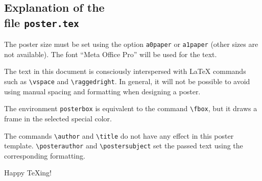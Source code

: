 \documentclass[a1paper, english]{article}
\begin{document}

\begin{posterbox}
	\vspace{-10mm}
	\raggedright

	\section*{Explanation of the\\file \texttt{poster.tex}}
	The poster size must be set using the option \verb+a0paper+ or \verb+a1paper+ (other sizes are not available).
	The font “Meta Office Pro” will be used for the text.

	The text in this document is consciously interspersed with \LaTeX{} commands such as \verb+\vspace+ and \verb+\raggedright+.
	In general, it will not be possible to avoid using manual spacing and formatting when designing a poster.

	The environment \verb+posterbox+ is equivalent to the command \verb+\fbox+, but it draws a frame in the selected special color.

	The commands \verb+\author+ and \verb+\title+ do not have any effect in this poster template.
	\verb+\posterauthor+ and \verb+\postersubject+ set the passed text using the corresponding formatting.

	\bigskip

	Happy \TeX{}ing!
\end{posterbox}

\vfill
\end{document}
